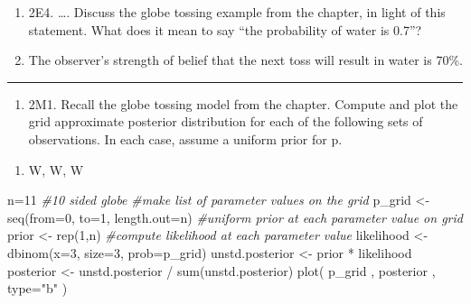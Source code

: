 \documentclass[
]{article}
\newenvironment{Shaded}{\begin{snugshade}}{\end{snugshade}}
\newcommand{\AttributeTok}[1]{\textcolor[rgb]{0.77,0.63,0.00}{#1}}
\newcommand{\CommentTok}[1]{\textcolor[rgb]{0.56,0.35,0.01}{\textit{#1}}}
\newcommand{\DecValTok}[1]{\textcolor[rgb]{0.00,0.00,0.81}{#1}}
\newcommand{\FunctionTok}[1]{\textcolor[rgb]{0.00,0.00,0.00}{#1}}
\newcommand{\NormalTok}[1]{#1}
\newcommand{\OtherTok}[1]{\textcolor[rgb]{0.56,0.35,0.01}{#1}}
\newcommand{\SpecialCharTok}[1]{\textcolor[rgb]{0.00,0.00,0.00}{#1}}
\newcommand{\StringTok}[1]{\textcolor[rgb]{0.31,0.60,0.02}{#1}}
\providecommand{\tightlist}{%
  \setlength{\itemsep}{0pt}\setlength{\parskip}{0pt}}
\begin{document}
\begin{enumerate}
\def\labelenumi{\Alph{enumi})}
\setcounter{enumi}{16}
\item
  2E4. \ldots. Discuss the globe tossing example from the chapter, in
  light of this statement. What does it mean to say ``the probability of
  water is 0.7''?
\item
  The observer's strength of belief that the next toss will result in
  water is 70\%.
\end{enumerate}

\begin{center}\rule{0.5\linewidth}{0.5pt}\end{center}

\begin{enumerate}
\def\labelenumi{\Alph{enumi})}
\setcounter{enumi}{16}
\tightlist
\item
  2M1. Recall the globe tossing model from the chapter. Compute and plot
  the grid approximate posterior distribution for each of the following
  sets of observations. In each case, assume a uniform prior for p.
\end{enumerate}

\begin{enumerate}
\def\labelenumi{(\arabic{enumi})}
\tightlist
\item
  W, W, W
\end{enumerate}

\begin{Shaded}
\begin{Highlighting}[]
\NormalTok{n}\OtherTok{=}\DecValTok{11} \CommentTok{\#10 sided globe}
\CommentTok{\#make list of parameter values on the grid}
\NormalTok{p\_grid }\OtherTok{\textless{}{-}} \FunctionTok{seq}\NormalTok{(}\AttributeTok{from=}\DecValTok{0}\NormalTok{, }\AttributeTok{to=}\DecValTok{1}\NormalTok{, }\AttributeTok{length.out=}\NormalTok{n)}
\CommentTok{\#uniform prior at each parameter value on grid}
\NormalTok{prior }\OtherTok{\textless{}{-}} \FunctionTok{rep}\NormalTok{(}\DecValTok{1}\NormalTok{,n)}
\CommentTok{\#compute likelihood at each parameter value}
\NormalTok{likelihood }\OtherTok{\textless{}{-}} \FunctionTok{dbinom}\NormalTok{(}\AttributeTok{x=}\DecValTok{3}\NormalTok{, }\AttributeTok{size=}\DecValTok{3}\NormalTok{, }\AttributeTok{prob=}\NormalTok{p\_grid)}
\NormalTok{unstd.posterior }\OtherTok{\textless{}{-}}\NormalTok{ prior }\SpecialCharTok{*}\NormalTok{ likelihood}
\NormalTok{posterior }\OtherTok{\textless{}{-}}\NormalTok{ unstd.posterior }\SpecialCharTok{/} \FunctionTok{sum}\NormalTok{(unstd.posterior)}
\FunctionTok{plot}\NormalTok{( p\_grid , posterior , }\AttributeTok{type=}\StringTok{"b"}\NormalTok{ )}
\end{Highlighting}
\end{Shaded}
\end{document}
